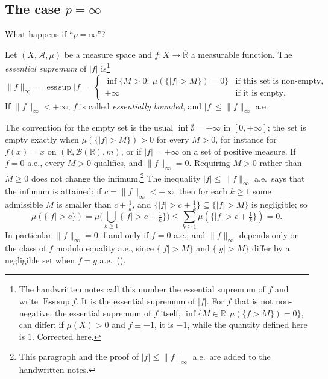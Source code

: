 \subsection{The case \texorpdfstring{$p=\infty$}{p = infinity}}\label{sec:ld-Linfty}

What happens if ``$p=\infty$''?

\begin{definition}\label{def:ld-Linfty}
Let $(X,\mathcal A,\mu)$ be a measure space and $f:X\to\overline{\mathbb R}$ a measurable
function. The \emph{essential supremum} of $|f|$ is\footnote{The handwritten notes call this
number the essential supremum of $f$ and write $\operatorname{Ess\,sup}f$. It is the essential
supremum of $|f|$. For $f$ that is not non-negative, the essential supremum of $f$ itself,
$\inf\{M\in\mathbb R:\mu(\{f>M\})=0\}$, can differ: if $\mu(X)>0$ and $f\equiv-1$, it is $-1$, while
the quantity defined here is $1$. Corrected here.}
\[
  \|f\|_\infty=\operatorname*{ess\,sup}|f|=
  \begin{cases}
    \inf\big\{M>0:\ \mu(\{|f|>M\})=0\big\} & \text{if this set is non-empty},\\[2pt]
    +\infty & \text{if it is empty}.
  \end{cases}
\]
If $\|f\|_\infty<+\infty$, $f$ is called \emph{essentially bounded}, and $|f|\le\|f\|_\infty$ a.e.
\end{definition}

The convention for the empty set is the usual $\inf\emptyset=+\infty$ in $[0,+\infty]$; the set
is empty exactly when $\mu(\{|f|>M\})>0$ for every $M>0$, for instance for $f(x)=x$ on
$(\mathbb R,\mathcal B(\mathbb R),m)$, or if $|f|=+\infty$ on a set of positive measure. If
$f=0$ a.e., every $M>0$ qualifies, and $\|f\|_\infty=0$. Requiring $M>0$ rather than $M\ge0$
does not change the infimum.\footnote{This paragraph and the proof of $|f|\le\|f\|_\infty$ a.e.\
are added to the handwritten notes.} The inequality $|f|\le\|f\|_\infty$ a.e.\ says that the
infimum is attained: if $c=\|f\|_\infty<+\infty$, then for each $k\ge1$ some admissible $M$ is
smaller than $c+\frac1k$, and $\{|f|>c+\frac1k\}\subseteq\{|f|>M\}$ is negligible; so
\[
  \mu(\{|f|>c\})=\mu\Big(\bigcup_{k\ge1}\{|f|>c+\tfrac1k\}\Big)\le\sum_{k\ge1}\mu(\{|f|>c+\tfrac1k\})=0 .
\]
In particular $\|f\|_\infty=0$ if and only if $f=0$ a.e.; and $\|f\|_\infty$ depends only on
the class of $f$ modulo equality a.e., since $\{|f|>M\}$ and $\{|g|>M\}$ differ by a negligible
set when $f=g$ a.e.\ (\exref{ex:ld-essup}).

